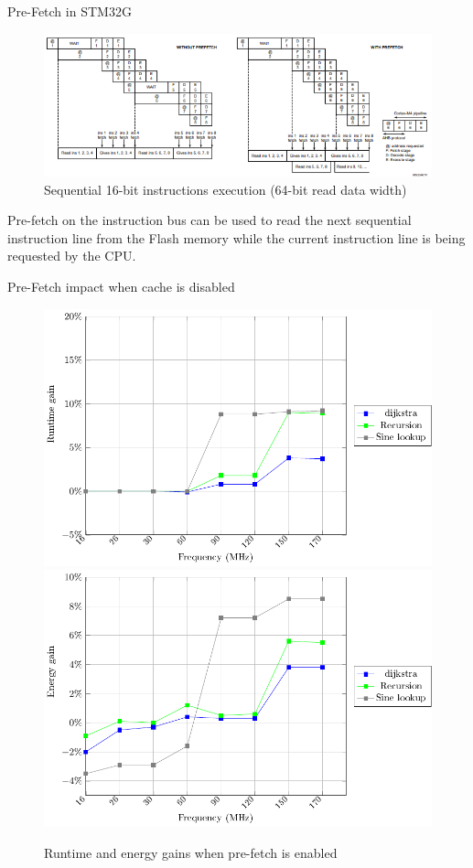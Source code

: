 \documentclass[
	11pt, %
]{beamer}
\begin{document}
\begin{frame}{Pre-Fetch in STM32G}
	\begin{figure}
		\includegraphics[scale=0.7]{images/prefetch32g.png}
		\caption{Sequential 16-bit instructions execution (64-bit read data width)}
	\end{figure}
	Pre-fetch on the instruction bus can be used to read the next sequential instruction line from the Flash memory while the current instruction line is being requested by the CPU. 
\end{frame}

\begin{frame}{Pre-Fetch impact when cache is disabled}
	\begin{figure}
		\includegraphics[scale = 0.4]{data/stm32g_v2/pre_fetch_impact_cache_off/duration.pdf}
		\includegraphics[scale = 0.4]{data/stm32g_v2/pre_fetch_impact_cache_off/energy.pdf}
		\caption{Runtime and energy gains when pre-fetch is enabled}
	\end{figure}
\end{frame}
\end{document}
